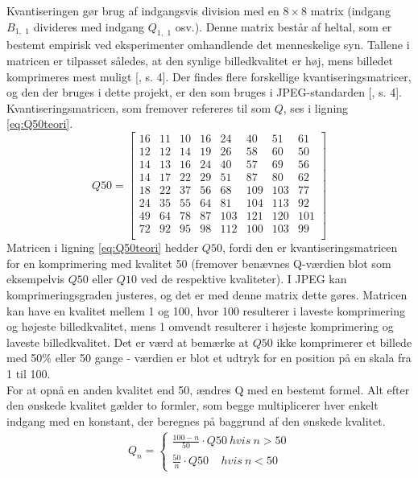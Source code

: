Kvantiseringen gør brug af indgangsvis division med en $8 \times 8$ matrix (indgang $B_{1,\phantom{i}1}$ divideres med indgang $Q_{1,\phantom{i}1}$ osv.). Denne matrix består af heltal, som  er bestemt empirisk ved eksperimenter omhandlende det menneskelige syn. Tallene i matricen er tilpasset således, at den synlige billedkvalitet er høj, mens billedet komprimeres mest muligt [\citet{lokminglui}, s. 4]. Der findes flere forskellige kvantiseringsmatricer, og den der bruges i dette projekt, er den som bruges i JPEG-standarden [\citet{lokminglui}, s. 4]. Kvantiseringsmatricen, som fremover refereres til som $Q$, ses i ligning \ref{eq:Q50teori}.
\begin{equation}
Q50 =
\begin{bmatrix}
	16	&	11	& 10		& 16		& 	24	&	40	& 51		& 61		\\
	12	&	12	& 14		& 19		& 	26	& 	58	& 60		& 50		\\
	14	&	13	& 16		& 24		& 	40	& 	57	& 69		& 56		\\
	14	&	17	& 22		& 29		& 	51	& 	87	& 80		& 62		\\
	18	&	22	& 37		& 56		& 	68	& 	109	& 103	& 77		\\
	24	&	35	& 55		& 64		& 	81	& 	104	& 113	& 92		\\
	49	&	64	& 78		& 87		& 	103	& 	121	& 120	& 101	\\
	72	&	92	& 95		& 98		& 	112	& 	100	& 103	& 99		\\
\end{bmatrix}
\label{eq:Q50teori}
\end{equation}
Matricen i ligning \vref{eq:Q50teori} hedder $Q50$, fordi den er kvantiseringsmatricen for en komprimering med kvalitet 50 (fremover benævnes Q-værdien blot som eksempelvis $Q50$ eller $Q10$ ved de respektive kvaliteter). I JPEG kan komprimeringsgraden justeres, og det er med denne matrix dette gøres. Matricen kan have en kvalitet mellem 1 og 100, hvor 100 resulterer i laveste komprimering og højeste billedkvalitet, mens 1 omvendt resulterer i højeste komprimering og laveste billedkvalitet. Det er værd at bemærke at $Q50$ ikke komprimerer et billede med 50\% eller 50 gange - værdien er blot et udtryk for en position på en skala fra 1 til 100.\\
For at opnå en anden kvalitet end 50, ændres Q med en bestemt formel. Alt efter den ønskede kvalitet gælder to formler, som begge multiplicerer hver enkelt indgang med en konstant, der beregnes på baggrund af den ønskede kvalitet.
\begin{align}
Q_n=\begin{cases}
	\frac{100-n}{50} \cdot Q50 \ hvis \ n > 50\\
	\frac{50}{n} \cdot Q50 \ \ \ \ \ hvis \ n < 50
\end{cases}
\end{align}
